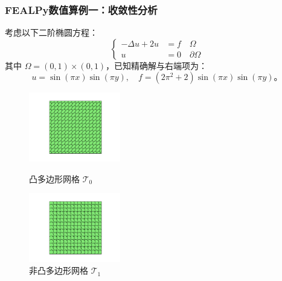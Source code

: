 \documentclass[notheorems,serif]{beamer}
\begin{document}
\begin{frame}
\frametitle{FEALPy数值算例一：收敛性分析}
考虑以下二阶椭圆方程：
$$
\left\{
\begin{aligned}
    -\Delta u + 2u & = f \quad \Omega \\
    u & = 0 \quad \partial\Omega
\end{aligned}
\right.
$$
其中 $\Omega = (0, 1)\times(0, 1)$，已知精确解与右端项为：
$$
u = \sin(\pi x)\sin(\pi y), \quad f = (2\pi^2+2)\sin(\pi x)\sin(\pi y)。
$$

\begin{figure}[htbp]
\centering
\begin{minipage}[t]{0.49\linewidth}
\centering
\includegraphics[width=4cm]{../figures/convex.pdf}
\caption{凸多边形网格 $\mathcal T_0$}
\end{minipage}%
\begin{minipage}[t]{0.49\linewidth}
\centering
\includegraphics[width=4cm]{../figures/nonconvex.pdf}
\caption{非凸多边形网格 $\mathcal T_1$}
\end{minipage}%
\centering
\end{figure}
\end{frame}
\end{document}
